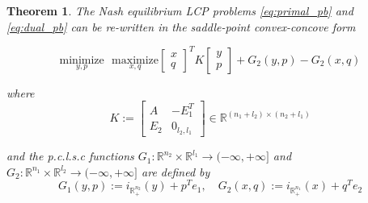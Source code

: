 \documentclass{article} %
\newtheorem{theorem}{Theorem} \newtheorem{lemma}[theorem]{Lemma}
\begin{document}
\begin{theorem}
  The Nash equilibrium LCP problems \eqref{eq:primal_pb} and \eqref{eq:dual_pb} can be re-written in the saddle-point convex-concove form
  
  \begin{equation}
    \underset{y, p}{\text{minimize}}\text{ }\underset{x, q}{\text{maximize}}
           {\begin{bmatrix}x\\q\end{bmatrix}^TK\begin{bmatrix}y\\p\end{bmatrix} + G_2(y, p) - G_2(x, q)}
           \label{eq:unconstrained_pb}
  \end{equation}

  where
  \begin{equation}
    K :=
    \left[
      \begin{array}{c|c}
        A & -E_1^T \\ \hline
        E_2 & 0_{l_2, l_1}
      \end{array}
      \right] \in \mathbb{R}^{(n_1 + l_2) \times (n_2 + l_1)}
\end{equation}

and the p.c.l.s.c functions $G_1: \mathbb{R}^{n_2} \times \mathbb{R}^{l_1} \rightarrow (-\infty, +\infty]$ and $G_2: \mathbb{R}^{n_1} \times \mathbb{R}^{l_2} \rightarrow (-\infty, +\infty]$ are defined by
  \begin{equation}
      G_1(y, p) := i_{\mathbb{R}^{n_2}_+}(y) + p^Te_1, \hspace{1em} G_2(x, q) := i_{\mathbb{R}^{n_1}_+}(x) + q^Te_2
    \label{eq:things}
  \end{equation}
  

  \label{thm:pd}
\end{theorem}
\end{document}
